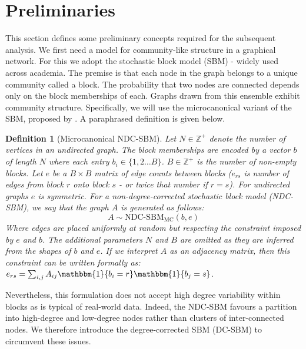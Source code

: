 \documentclass{article}
\newcommand{\Integers}{\mathbb{Z}}
\newcommand{\one}{\mathbbm{1}}
\newtheorem{definition}{Definition}[section]
\begin{document}
\section{Preliminaries}

This section defines some preliminary concepts required for the subsequent analysis. We first need a model for community-like structure in a graphical network. For this we adopt the stochastic block model (SBM) - widely used across academia. The premise is that each node in the graph belongs to a unique community called a block. The probability that two nodes are connected depends only on the block memberships of each. Graphs drawn from this ensemble exhibit community structure. Specifically, we will use the microcanonical variant of the SBM, proposed by \citet{Peixoto-Bayesian-Microcanonical}. A paraphrased definition is given below.

\begin{definition}[Microcanonical NDC-SBM]
	\label{defn:microcan-ndc-sbm}
	Let $N \in \Integers^{+}$ denote the number of vertices in an undirected graph. The block memberships are encoded by a vector $b$ of length $N$ where each entry $b_i \in \{1, 2 \dots B\}$. $B \in \Integers^{+}$ is the number of non-empty blocks. Let $e$ be a $B \times B$ matrix of edge counts between blocks ($e_{rs}$ is number of edges from block $r$ onto block $s$ - or twice that number if $r=s$). For undirected graphs $e$ is symmetric. For a non-degree-corrected stochastic block model (NDC-SBM), we say that the graph $A$ is generated as follows:
	\begin{equation}
		A \sim \textrm{NDC-SBM}_{\textrm{MC}} (b, e)
	\end{equation}
	Where edges are placed uniformly at random but respecting the constraint imposed by $e$ and $b$. The additional parameters $N$ and $B$ are omitted as they are inferred from the shapes of $b$ and $e$. If we interpret $A$ as an adjacency matrix, then this constraint can be written formally as: $e_{rs} = \sum_{i,j} A_{ij} \one \{b_i = r\} \one \{b_j = s\}$.
\end{definition}

Nevertheless, this formulation does not accept high degree variability within blocks as is typical of real-world data. Indeed, the NDC-SBM favours a partition into high-degree and low-degree nodes rather than clusters of inter-connected nodes. We therefore introduce the degree-corrected SBM (DC-SBM) to circumvent these issues. 
\end{document}
